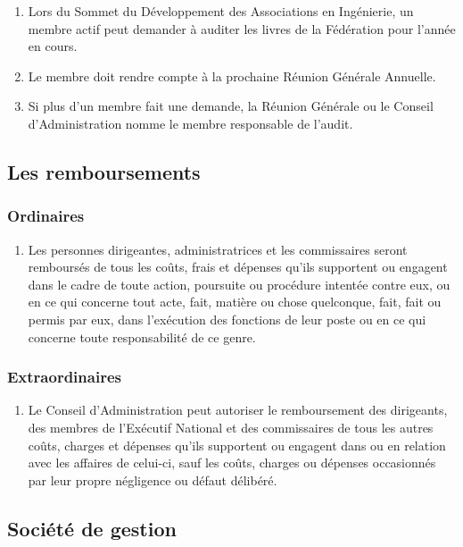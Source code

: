 \begin{enumerate}
 \item Lors du Sommet du Développement des Associations en Ingénierie, un membre actif peut demander à auditer les livres de la Fédération pour l'année en cours.
 \item Le membre doit rendre compte à la prochaine Réunion Générale Annuelle.
 \item Si plus d'un membre fait une demande, la Réunion Générale ou le Conseil d'Administration nomme le membre responsable de l'audit.
\end{enumerate}

\subsection{Les remboursements}
\label{les-remboursements}

\subsubsection{Ordinaires}
\label{ordinaires}

\begin{enumerate}
 \item
  Les personnes dirigeantes, administratrices et les commissaires seront remboursés de tous les coûts, frais et dépenses qu'ils supportent ou engagent dans le cadre de toute action, poursuite ou procédure intentée contre eux, ou en ce qui concerne tout acte, fait, matière ou chose quelconque, fait, fait ou permis par eux, dans l'exécution des fonctions de leur poste ou en ce qui concerne toute responsabilité de ce genre.
\end{enumerate}

\subsubsection{Extraordinaires}
\label{extraordinaires}

\begin{enumerate}
 \item
  Le Conseil d'Administration peut autoriser le remboursement des dirigeants, des membres de l'Exécutif National et des commissaires de tous les autres coûts, charges et dépenses qu'ils supportent ou engagent dans ou en relation avec les affaires de celui-ci, sauf les coûts, charges ou dépenses occasionnés par leur propre négligence ou défaut délibéré.
\end{enumerate}

\subsection{Société de gestion}
\label{societe-de-gestion}

